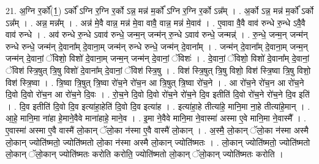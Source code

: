 \documentclass[17pt]{extarticle}
\begin{document}
21. अ॒ग्नि र॒र्को᳚(1॒) ऽर्को᳚ ऽग्नि र॒ग्नि र॒र्को ऽन्न॒ मन्न॑ म॒र्को᳚ ऽग्नि र॒ग्नि र॒र्को ऽन्न᳚म् । . अ॒र्को ऽन्न॒ मन्न॑ म॒र्को᳚ ऽर्को ऽन्न᳚म् । . अन्न॒ मन्न᳚म् । . अन्न॑ मे॒वै वान्न॒ मन्न॑ मे॒वा वावै॒ वान्न॒ मन्न॑ मे॒वाव॑ । . ए॒वावा वै॒वै वाव॑ रुन्धे रु॒न्धे ऽवै॒वै वाव॑ रुन्धे । . अव॑ रुन्धे रु॒न्धे ऽवाव॑ रुन्धे॒ जन्म॒न् जन्म॑न् रु॒न्धे ऽवाव॑ रुन्धे॒ जन्मन्न्॑ । . रु॒न्धे॒ जन्म॒न् जन्म॑न् रुन्धे रुन्धे॒ जन्म॑न् दे॒वाना᳚म् दे॒वाना॒म् जन्म॑न् रुन्धे रुन्धे॒ जन्म॑न् दे॒वाना᳚म् । . जन्म॑न् दे॒वाना᳚म् दे॒वाना॒म् जन्म॒न् जन्म॑न् दे॒वानां॒ ॅविशो॒ विशो॑ दे॒वाना॒म् जन्म॒न् जन्म॑न् दे॒वानां॒ ॅविशः॑ । . दे॒वानां॒ ॅविशो॒ विशो॑ दे॒वाना᳚म् दे॒वानां॒ ॅविश॑ स्त्रि॒षुत् त्रि॒षु विशो॑ दे॒वाना᳚म् दे॒वानां॒ ॅविश॑ स्त्रि॒षु । . विश॑ स्त्रि॒षुत् त्रि॒षु विशो॒ विश॑ स्त्रि॒ष्वा त्रि॒षु विशो॒ विश॑ स्त्रि॒ष्वा । . त्रि॒ष्वा त्रि॒षुत् त्रि॒ष्वा रो॑च॒ने रो॑च॒न आ त्रि॒षुत् त्रि॒ष्वा रो॑च॒ने । . आ रो॑च॒ने रो॑च॒न आ रो॑च॒ने दि॒वो दि॒वो रो॑च॒न आ रो॑च॒ने दि॒वः । . रो॒च॒ने दि॒वो दि॒वो रो॑च॒ने रो॑च॒ने दि॒व इतीति॑ दि॒वो रो॑च॒ने रो॑च॒ने दि॒व इति॑ । . दि॒व इतीति॑ दि॒वो दि॒व इत्या॑हा॒हेति॑ दि॒वो दि॒व इत्या॑ह । . इत्या॑हा॒हे तीत्या॑हे॒ मानि॒मा ना॒हे तीत्या॑हे॒मान् । . आ॒हे॒ मानि॒मा ना॑हा हे॒माने॒वैवे माना॑हाहे॒ माने॒व । . इ॒मा ने॒वैवे मानि॒मा ने॒वास्मा॑ अस्मा ए॒वे मानि॒मा ने॒वास्मै᳚ । . ए॒वास्मा॑ अस्मा ए॒वै वास्मै॑ लो॒कान् ॅलो॒का न॑स्मा ए॒वै वास्मै॑ लो॒कान् । . अ॒स्मै॒ लो॒कान् ॅलो॒का न॑स्मा अस्मै लो॒कान् ज्योति॑ष्मतो॒ ज्योति॑ष्मतो लो॒का न॑स्मा अस्मै लो॒कान् ज्योति॑ष्मतः । . लो॒कान् ज्योति॑ष्मतो॒ ज्योति॑ष्मतो लो॒कान् ॅलो॒कान् ज्योति॑ष्मतः करोति करोति॒ ज्योति॑ष्मतो लो॒कान् ॅलो॒कान् ज्योति॑ष्मतः करोति । \newline
\end{document}
